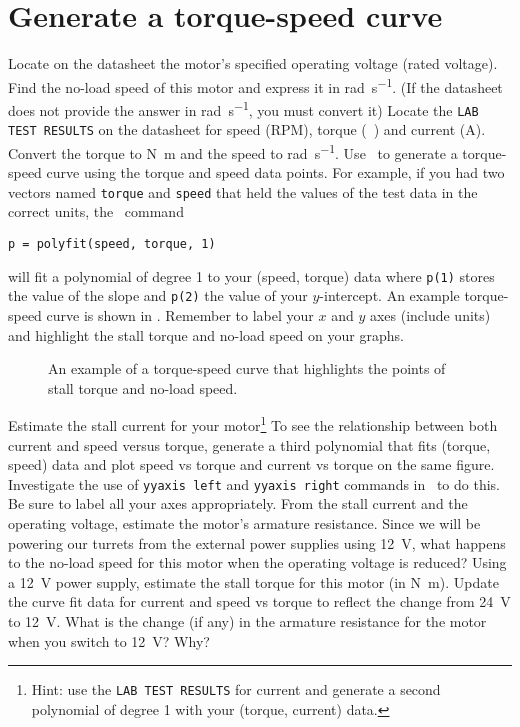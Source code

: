 \documentclass{exam}
\begin{document}
\section{Generate a torque-speed curve}
\begin{questions}
\question Locate on the datasheet the motor’s specified operating voltage (rated voltage).
\question Find the no-load speed of this motor and express it in \si{\radian\per\second}. (If the datasheet does not provide the answer in \si{\radian\per\second}, you must convert it)
\question Locate the \lstinline{LAB TEST RESULTS} on the datasheet for speed (\si{RPM}), torque (\si{\ounce\inch}) and current (\si{\ampere}).  Convert the torque to \si{\newton\meter} and the speed to \si{\radian\per\second}.  
\question Use \Matlab\ to generate a torque-speed curve using the torque and speed data points.  For example, if you had two vectors named \lstinline{torque} and \lstinline{speed} that held the values of the test data in the correct units, the \Matlab\ command
\begin{lstlisting}[style=usnaMatlab]
p = polyfit(speed, torque, 1)
\end{lstlisting}
will fit a polynomial of degree 1 to your (speed, torque) data where \lstinline{p(1)} stores the value of the slope and \lstinline{p(2)} the value of your $y$-intercept.  An example torque-speed curve is shown in .  Remember to label your $x$ and $y$ axes (include units) and highlight the stall torque and no-load speed on your graphs.  
\begin{figure}[h]
\caption{An example of a torque-speed curve that highlights the points of stall torque and no-load speed.}
\label{fig:2}
\end{figure}
\question Estimate the stall current for your motor\footnote{Hint: use the \lstinline{LAB TEST RESULTS} for current and generate a second polynomial of degree 1 with your (torque, current) data.}  To see the relationship between both current and speed versus torque, generate a third polynomial that fits (torque, speed) data and plot speed vs torque and current vs torque on the same figure.  Investigate the use of \lstinline{yyaxis left} and \lstinline{yyaxis right} commands in \Matlab\ to do this.  Be sure to label all your axes appropriately.
\question From the stall current and the operating voltage, estimate the motor’s armature resistance.
\question Since we will be powering our turrets from the external power supplies using \SI{12}{\volt}, what happens to the no-load speed for this motor when the operating voltage is reduced?  
\question Using a \SI{12}{\volt} power supply, estimate the stall torque for this motor (in \si{\newton\meter}).  
\question Update the curve fit data for current and speed vs torque to reflect the change from \SI{24}{\volt} to \SI{12}{\volt}.
\question What is the change (if any) in the armature resistance for the motor when you switch to \SI{12}{\volt}?  Why?
\end{questions}
    
\end{document}
